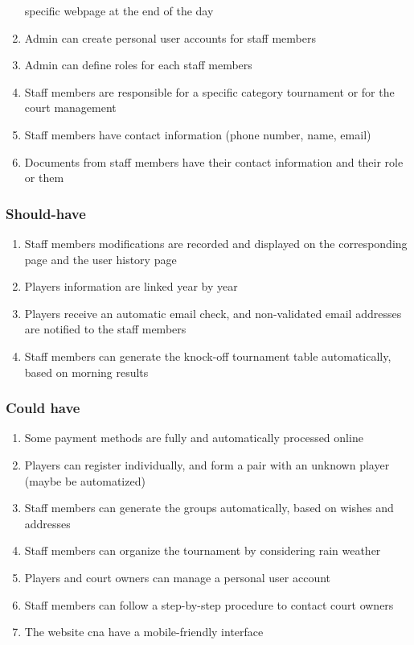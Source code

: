 \begin{enumerate}
        specific webpage at the end of the day
    \item Admin can create personal user accounts for staff members
    \item Admin can define roles for each staff members
    \item Staff members are responsible for a specific category
        tournament or for the court management 
    \item Staff members have contact information (phone number, name,
        email)
    \item Documents from staff members have their contact information
        and their role or them
\end{enumerate}

\subsubsection{Should-have}

\begin{enumerate}
    \item Staff members modifications are recorded and displayed on the
        corresponding page and the user history page
    \item Players information are linked year by year
    \item Players receive an automatic email check, and non-validated
        email addresses are notified to the staff members
    \item Staff members can generate the knock-off tournament table
        automatically, based on morning results
\end{enumerate}

\subsubsection{Could have}

\begin{enumerate}
    \item Some payment methods are fully and automatically processed
        online
    \item Players can register individually, and form a pair with an
        unknown player (maybe be automatized)
    \item Staff members can generate the groups automatically, based on
        wishes and addresses
    \item Staff members can organize the tournament by considering rain
        weather
    \item Players and court owners can manage a personal user
        account
    \item Staff members can follow a step-by-step procedure to contact
        court owners
    \item The website cna have a mobile-friendly interface
\end{enumerate}

